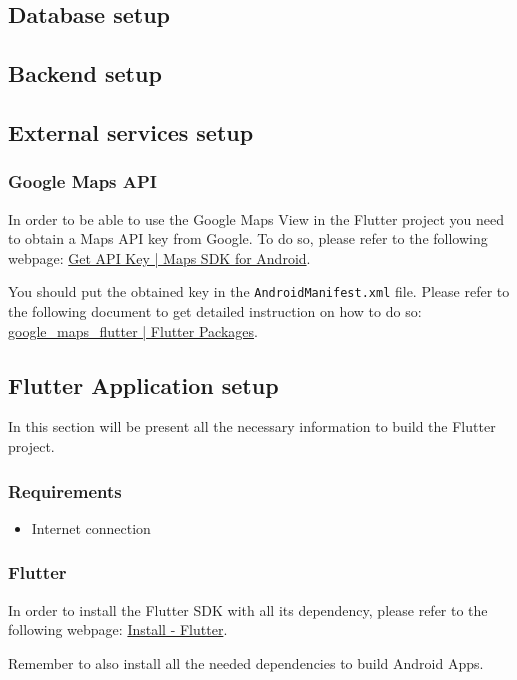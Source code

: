 \subsection{Database setup}

\subsection{Backend setup}

\subsection{External services setup}
\subsubsection{Google Maps API}
In order to be able to use the Google Maps View in the Flutter project you need to obtain a Maps API key from Google. To do so, please refer to the following webpage:
\href{https://developers.google.com/maps/documentation/android-sdk/signup}{Get API Key | Maps SDK for Android}.

You should put the obtained key in the \texttt{AndroidManifest.xml} file. Please refer to the following document to get detailed instruction on how to do so:
\href{https://pub.dartlang.org/packages/google_maps_flutter}{google\_maps\_flutter | Flutter Packages}.

\subsection{Flutter Application setup}
In this section will be present all the necessary information to build the Flutter project.
\subsubsection{Requirements}
\begin{itemize}
    \item Internet connection
\end{itemize}

\subsubsection{Flutter}
In order to install the Flutter SDK with all its dependency, please refer to the following webpage: \href{https://flutter.io/docs/get-started/install}{Install - Flutter}.

Remember to also install all the needed dependencies to build Android Apps.

